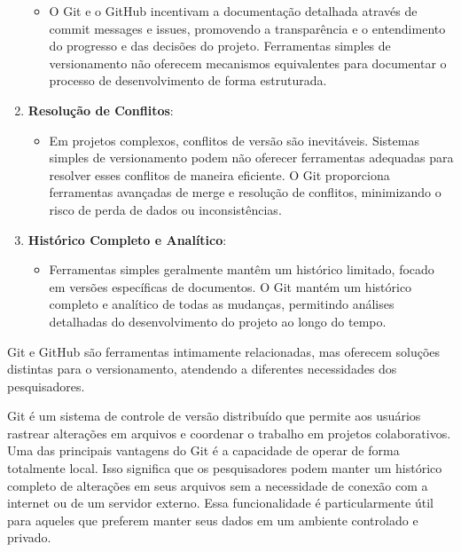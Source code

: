 \documentclass[
  a4paper,
]{book}
\providecommand{\tightlist}{%
  \setlength{\itemsep}{0pt}\setlength{\parskip}{0pt}}\usepackage{longtable,booktabs,array}
\begin{document}
\begin{enumerate}
  \begin{itemize}
  \tightlist
  \item
    O Git e o GitHub incentivam a documentação detalhada através de
    commit messages e issues, promovendo a transparência e o
    entendimento do progresso e das decisões do projeto. Ferramentas
    simples de versionamento não oferecem mecanismos equivalentes para
    documentar o processo de desenvolvimento de forma estruturada.
  \end{itemize}
\item
  \textbf{Resolução de Conflitos}:

  \begin{itemize}
  \tightlist
  \item
    Em projetos complexos, conflitos de versão são inevitáveis. Sistemas
    simples de versionamento podem não oferecer ferramentas adequadas
    para resolver esses conflitos de maneira eficiente. O Git
    proporciona ferramentas avançadas de merge e resolução de conflitos,
    minimizando o risco de perda de dados ou inconsistências.
  \end{itemize}
\item
  \textbf{Histórico Completo e Analítico}:

  \begin{itemize}
  \tightlist
  \item
    Ferramentas simples geralmente mantêm um histórico limitado, focado
    em versões específicas de documentos. O Git mantém um histórico
    completo e analítico de todas as mudanças, permitindo análises
    detalhadas do desenvolvimento do projeto ao longo do tempo.
  \end{itemize}
\end{enumerate}

Git e GitHub são ferramentas intimamente relacionadas, mas oferecem
soluções distintas para o versionamento, atendendo a diferentes
necessidades dos pesquisadores.

Git é um sistema de controle de versão distribuído que permite aos
usuários rastrear alterações em arquivos e coordenar o trabalho em
projetos colaborativos. Uma das principais vantagens do Git é a
capacidade de operar de forma totalmente local. Isso significa que os
pesquisadores podem manter um histórico completo de alterações em seus
arquivos sem a necessidade de conexão com a internet ou de um servidor
externo. Essa funcionalidade é particularmente útil para aqueles que
preferem manter seus dados em um ambiente controlado e privado.
\end{document}
